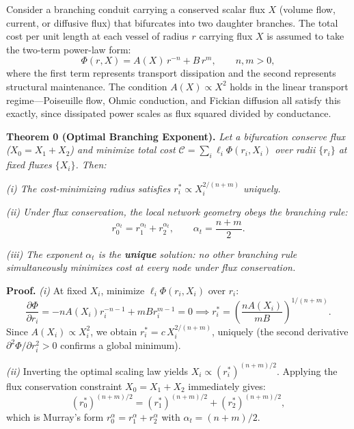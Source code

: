 \documentclass[11pt,a4paper]{article}
\theoremstyle{remark}
\newcounter{manualthm}
\begin{document}
Consider a branching conduit carrying a conserved scalar flux $X$ (volume flow,
current, or diffusive flux) that bifurcates into two daughter branches. The
total cost per unit length at each vessel of radius $r$ carrying flux $X$ is
assumed to take the two-term power-law form:
\begin{equation}
\Phi(r, X) = A(X)\, r^{-n} + B\, r^{m}, \qquad n, m > 0,
\end{equation}
where the first term represents transport dissipation and the second represents
structural maintenance. The condition $A(X) \propto X^2$ holds in the linear
transport regime---Poiseuille flow, Ohmic conduction, and Fickian diffusion all
satisfy this exactly, since dissipated power scales as flux squared divided by
conductance.

\vspace{0.5em}
\noindent \textbf{Theorem 0 (Optimal Branching Exponent).}\label{thm:branching} \textit{Let a bifurcation conserve flux ($X_0 = X_1 + X_2$) and minimize total cost $\mathcal{C} = \sum_i \ell_i \Phi(r_i, X_i)$ over radii $\{r_i\}$ at fixed fluxes $\{X_i\}$. Then:}

\textit{(i) The cost-minimizing radius satisfies $r_i^* \propto X_i^{2/(n+m)}$ uniquely.}

\textit{(ii) Under flux conservation, the local network geometry obeys the branching rule:}
\begin{equation}
r_0^{\alpha_t} = r_1^{\alpha_t} + r_2^{\alpha_t}, \qquad \alpha_t =
\frac{n+m}{2}.
\end{equation}

\textit{(iii) The exponent $\alpha_t$ is the \textbf{unique} solution: no other branching rule simultaneously minimizes cost at every node under flux conservation.}

\vspace{0.5em}
\noindent\textbf{Proof.}
\textit{(i)} At fixed $X_i$, minimize $\ell_i \Phi(r_i, X_i)$ over $r_i$:
\begin{equation*}
\frac{\partial \Phi}{\partial r_i} = -n A(X_i) r_i^{-n-1} + m B r_i^{m-1} = 0 \implies r_i^* = \left(\frac{n A(X_i)}{m B}\right)^{1/(n+m)}.
\end{equation*}
Since $A(X_i) \propto X_i^2$, we obtain $r_i^* = c\, X_i^{2/(n+m)}$, uniquely
(the second derivative $\partial^2\Phi/\partial r_i^2 > 0$ confirms a global
minimum).

\textit{(ii)} Inverting the optimal scaling law yields $X_i \propto (r_i^*)^{(n+m)/2}$. Applying the flux conservation constraint $X_0 = X_1 + X_2$ immediately gives:
\begin{equation*}
(r_0^*)^{(n+m)/2} = (r_1^*)^{(n+m)/2} + (r_2^*)^{(n+m)/2},
\end{equation*}
which is Murray's form $r_0^\alpha = r_1^\alpha + r_2^\alpha$ with $\alpha_t =
(n+m)/2$.
\end{document}
